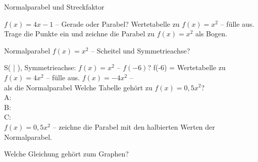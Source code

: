 \setcounter{aufgabe}{10}

\begin{aufgabe}{Normalparabel und Streckfaktor}
\begin{teile}
\teil $f(x) = 4x - 1$ – Gerade oder Parabel?  
\teil Wertetabelle zu $f(x) = x^2$ – fülle aus.
\teil Trage die Punkte ein und zeichne die Parabel zu $f(x) = x^2$ als Bogen.

\begin{ksys}[xmin=-4,xmax=4,ymin=-1,ymax=10]
\end{ksys}
\teil Normalparabel $f(x) = x^2$ – Scheitel und Symmetrieachse?

\begin{ksys}[xmin=-4,xmax=4,ymin=-1,ymax=9,ablesen]
\end{ksys}
S( \leerfeld | \leerfeld ), Symmetrieachse: \leerfeld
\teil $f(x) = x^2$ – $f(-6)$? f(-6) = \leerfeld
\teil Wertetabelle zu $f(x) = 4x^2$ – fülle aus.
\teil $f(x) = -4x^2$ –   \\   als die Normalparabel
\teil Welche Tabelle gehört zu $f(x) = 0{,}5x^2$? \\ A:  \\ B:  \\ C:  \\   
\teil $f(x) = 0{,}5x^2$ – zeichne die Parabel mit den halbierten Werten der Normalparabel.

\begin{ksys}[xmin=-5,xmax=5,ymin=-1,ymax=9]
\end{ksys}
\teil Welche Gleichung gehört zum Graphen? \\  \\  \\  \\ 


\end{teile}
\end{aufgabe}
